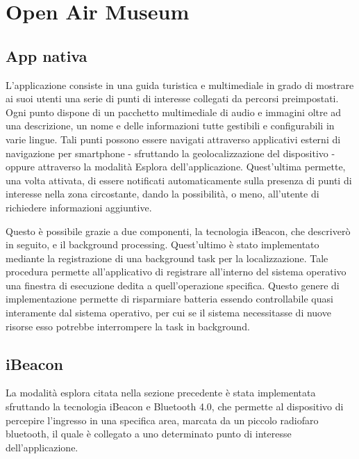 \chapter{Open Air Museum} %
\label{Open Air Museum}

\vspace{5mm}

\section{App nativa}\vspace{5mm}

L’applicazione consiste in una guida turistica e multimediale in grado di mostrare ai suoi utenti una serie di punti di interesse collegati da percorsi preimpostati. Ogni punto dispone di un pacchetto multimediale di audio e immagini oltre ad una descrizione, un nome e delle informazioni tutte gestibili e configurabili in varie lingue. Tali punti possono essere navigati attraverso applicativi esterni di navigazione per smartphone - sfruttando la geolocalizzazione del dispositivo - oppure attraverso la modalità Esplora dell’applicazione. Quest'ultima permette, una volta attivata, di essere notificati automaticamente sulla presenza di punti di interesse nella zona circostante, dando la possibilità, o meno, all’utente di richiedere informazioni aggiuntive. \vspace{5mm}

Questo è possibile grazie a due componenti, la tecnologia iBeacon, che descriverò in seguito, e il background processing. Quest'ultimo è stato implementato mediante la registrazione di una background task per la localizzazione. Tale procedura permette all'applicativo di registrare all'interno del sistema operativo una finestra di esecuzione dedita a quell'operazione specifica. Questo genere di implementazione permette di risparmiare batteria essendo controllabile quasi interamente dal sistema operativo, per cui se il sistema necessitasse di nuove risorse esso potrebbe interrompere la task in background.\vspace{5mm}

\section{iBeacon}\vspace{5mm}

La modalità esplora citata nella sezione precedente è stata implementata sfruttando la tecnologia iBeacon e Bluetooth 4.0, che permette al dispositivo di percepire l’ingresso in una specifica area, marcata da un piccolo radiofaro bluetooth, il quale è collegato a uno determinato punto di interesse dell'applicazione.\vspace{5mm}

